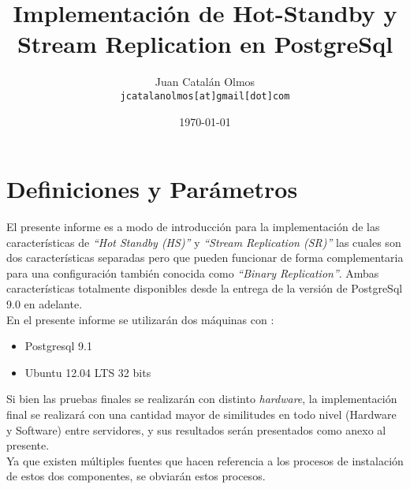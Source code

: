 \documentclass[11pt]{article}
\title{\textbf{Implementaci\'on de Hot-Standby y Stream Replication en PostgreSql}}
\author{Juan Catal\'an Olmos\\
		\texttt{jcatalanolmos[at]gmail[dot]com}}
\date{\today}
\begin{document}
\maketitle

\section{Definiciones y Par\'ametros}
El presente informe es a modo de introducci\'on para la implementaci\'on de las caracter\'isticas de \textit{``Hot Standby (HS)''} y \textit{``Stream Replication (SR)''} las cuales son dos caracter\'isticas separadas pero que pueden funcionar de forma complementaria para una configuraci\'on tambi\'en conocida como \textit{\emph{``Binary Replication''}}. Ambas caracter\'isticas totalmente disponibles desde la entrega de la versi\'on de PostgreSql 9.0 en adelante.\\

En el presente informe se utilizar\'an dos m\'aquinas con :

\begin{itemize}
\item Postgresql 9.1
\item Ubuntu 12.04 LTS 32 bits
\end{itemize}

Si bien las pruebas finales se realizar\'an con distinto \textit{hardware}, la implementaci\'on final se realizar\'a con una cantidad mayor de similitudes en todo nivel (Hardware y Software) entre servidores, y sus resultados ser\'an presentados como anexo al presente. \\

Ya que existen m\'ultiples fuentes que hacen referencia a los procesos de instalaci\'on de estos dos componentes, se obviar\'an estos procesos.

\newpage
\end{document}
